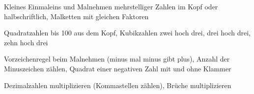 \setcounter{aufgabe}{0}

\begin{aufgabe}{Kleines Einmaleins und Malnehmen mehrstelliger Zahlen im Kopf oder halbschriftlich, Malketten mit gleichen Faktoren}
\end{aufgabe}

\begin{aufgabe}{Quadratzahlen bis 100 aus dem Kopf, Kubikzahlen zwei hoch drei, drei hoch drei, zehn hoch drei}
\end{aufgabe}

\begin{aufgabe}{Vorzeichenregel beim Malnehmen (minus mal minus gibt plus), Anzahl der Minuszeichen zählen, Quadrat einer negativen Zahl mit und ohne Klammer}
\end{aufgabe}

\begin{aufgabe}{Dezimalzahlen multiplizieren (Kommastellen zählen), Brüche multiplizieren}
\end{aufgabe}

